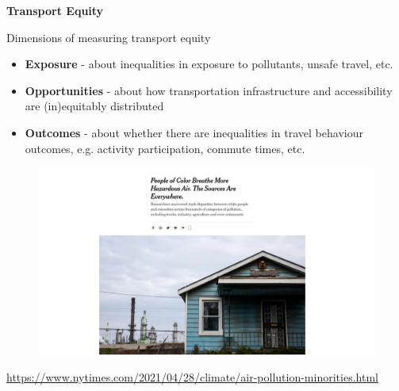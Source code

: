 \documentclass[aspectratio=169]{beamer}
\begin{document}
\begin{frame}
	
	\textbf{Transport Equity}
	
	\vspace{4mm}
	
	Dimensions of measuring transport equity
	
	\begin{itemize}	
		
		\item \textbf{Exposure} - about inequalities in exposure to pollutants, unsafe travel, etc.
		
		\item \textbf{Opportunities} - about how transportation infrastructure and accessibility are (in)equitably distributed
		
		\item \textbf{Outcomes} - about whether there are inequalities in travel behaviour outcomes, e.g. activity participation, commute times, etc.
		
	\end{itemize}
	
	
\end{frame}



\begin{frame}
	
	\begin{figure}
		\centering
		\includegraphics[width=1\linewidth]{images/race-pollution}
	\end{figure}

	\tiny\url{https://www.nytimes.com/2021/04/28/climate/air-pollution-minorities.html}
	
\end{frame}
\end{document}
